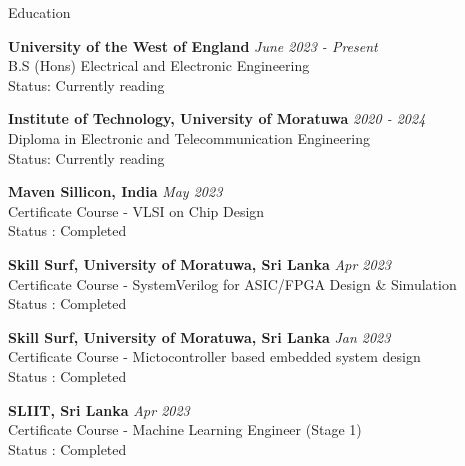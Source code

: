 \documentclass[
	11pt, %
]{./assets/resume} %
\begin{document}
\begin{rSection}{Education}

	\textbf{University of the West of England} \hfill \textit{June 2023 - Present} \\ 
	B.S (Hons) Electrical and Electronic Engineering \\
	Status: Currently reading

	\textbf{Institute of Technology, University of Moratuwa} \hfill \textit{2020 - 2024} \\ 
	Diploma in Electronic and Telecommunication Engineering \\
	Status: Currently reading
	
	\textbf{Maven Sillicon, India} \hfill \textit{May 2023} \\ 
	Certificate Course - VLSI on Chip Design \\
	Status : Completed

	\textbf{Skill Surf, University of Moratuwa, Sri Lanka} \hfill \textit{Apr 2023} \\ 
	Certificate Course - SystemVerilog for ASIC/FPGA Design \& Simulation \\
	Status : Completed
	
	\textbf{Skill Surf, University of Moratuwa, Sri Lanka} \hfill \textit{Jan 2023} \\ 
	Certificate Course - Mictocontroller based embedded system design \\
	Status : Completed

	\textbf{SLIIT, Sri Lanka} \hfill \textit{Apr 2023} \\ 
	Certificate Course - Machine Learning Engineer (Stage 1) \\
	Status : Completed


\end{rSection}
\end{document}
